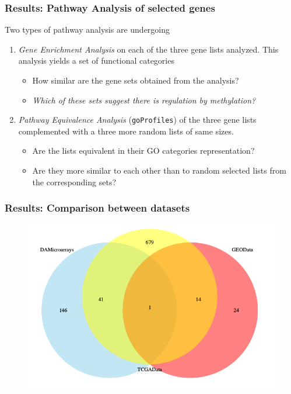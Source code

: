 \documentclass[handout]{beamer}
\begin{document}
\begin{frame}[allowframebreaks]
\end{frame}

\begin{frame}
\frametitle{Results: Pathway Analysis of selected genes}
Two types of pathway analysis are undergoing
\begin{enumerate}
	\item \textit{Gene Enrichment Analysis} on each of the three gene lists analyzed. \newline
	This analysis yields a set of functional categories
	\begin{itemize}
		\item How similar are the gene sets obtained from the analysis?
		\item \textit{Which of these sets suggest there is regulation by methylation?}
	\end{itemize}
	\item \textit{Pathway Equivalence Analysis} (\texttt{goProfiles}) of the three gene lists complemented with a three more random lists of same sizes. 
	\begin{itemize}
	\item Are the lists equivalent in their GO categories representation?
	\item Are they more similar to each other than to random selected lists from the corresponding sets?
	\end{itemize}
\end{enumerate}
\end{frame}

\begin{frame}
	\frametitle{Results: Comparison between datasets}
\begin{center}
	\begin{figure}[h]          
		\includegraphics[height=0.8\textheight]{images/genesInCommonBetweenHEURISTICselections.png}
	\end{figure}
\end{center}
\end{frame}
\end{document}
